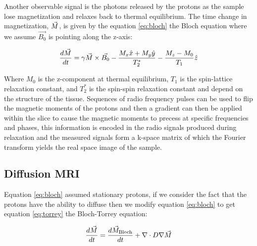 Another observable signal is the photons released by the protons as the sample lose magnetization and relaxes back to thermal equilibrium. The time change in magnetization, $\vec{M}$, is given by the equation \ref{eq:bloch} the Bloch equation where we assume $\vec{B_0}$ is pointing along the z-axis:

\begin{equation}
    \frac{d \vec{M}}{dt} = \gamma \vec{M} \times \vec{B_0} - \frac{M_x \hat{x} + M_y \hat{y}}{T_2^*} - \frac{M_z - M_0}{T_1}\hat{z}
    \label{eq:bloch}
\end{equation}

Where $M_0$ is the z-component at thermal equilibrium, $T_1$ is the spin-lattice relaxation constant, and $T_2^*$ is the spin-spin relaxation constant and depend on the structure of the tissue. \cite{bushberg2011essential} Sequences of radio frequency pulses can be used to flip the magnetic moments of the protons and then a gradient can then be applied within the slice to cause the magnetic moments to precess at specific frequencies and phases, this information is encoded in the radio signals produced during relaxation and the measured \mr signals form a k-space matrix of which the Fourier transform yields the real space image of the sample.





\subsection{Diffusion MRI}

Equation \ref{eq:bloch} assumed stationary protons, if we consider the fact that the protons have the ability to diffuse then we modify equation \ref{eq:bloch} to get equation \ref{eq:torrey} the Bloch-Torrey equation:

\begin{equation}
    \frac{d \vec{M}}{dt} = \frac{d \vec{M}_{\text{Bloch}}}{dt} + \nabla \cdot D \nabla \vec{M}
    \label{eq:torrey}
\end{equation}

